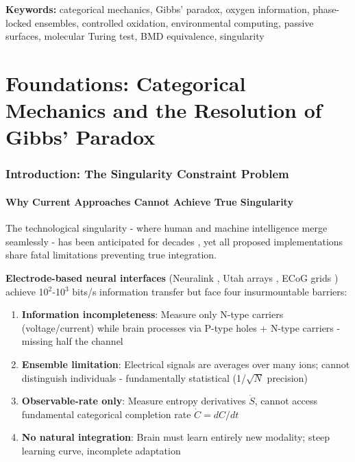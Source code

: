 \documentclass[11pt,a4paper]{article}
\theoremstyle{definition}
\theoremstyle{remark}
\begin{document}
\textbf{Keywords:} categorical mechanics, Gibbs' paradox, oxygen information, phase-locked ensembles, controlled oxidation, environmental computing, passive surfaces, molecular Turing test, BMD equivalence, singularity


\tableofcontents
\newpage

\part{Foundations: Categorical Mechanics and the Resolution of Gibbs' Paradox}

\section{Introduction: The Singularity Constraint Problem}

\subsection{Why Current Approaches Cannot Achieve True Singularity}

The technological singularity - where human and machine intelligence merge seamlessly - has been anticipated for decades \cite{Vinge1993,Kurzweil2005}, yet all proposed implementations share fatal limitations preventing true integration.

\textbf{Electrode-based neural interfaces} (Neuralink \cite{Musk2019}, Utah arrays \cite{Hochberg2012}, ECoG grids \cite{Leuthardt2004}) achieve 10$^2$-10$^3$ bits/s information transfer but face four insurmountable barriers:

\begin{enumerate}
\item \textbf{Information incompleteness}: Measure only N-type carriers (voltage/current) while brain processes via P-type holes + N-type carriers - missing half the channel
\item \textbf{Ensemble limitation}: Electrical signals are averages over many ions; cannot distinguish individuals - fundamentally statistical (1/$\sqrt{N}$ precision)
\item \textbf{Observable-rate only}: Measure entropy derivatives $\dot{S} $, cannot access fundamental categorical completion rate $\dot{C} = dC/dt$
\item \textbf{No natural integration}: Brain must learn entirely new modality; steep learning curve, incomplete adaptation
\end{enumerate}
\end{document}
